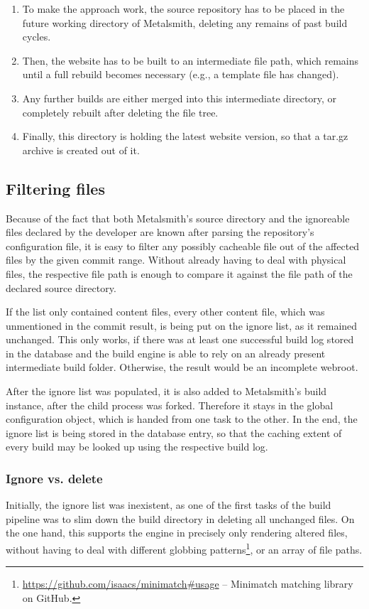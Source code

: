 \begin{enumerate}
  \item To make the approach work, the source repository has to be placed in the future working directory of Metalsmith, deleting any remains of past build cycles.
  \item Then, the website has to be built to an intermediate file path, which remains until a full rebuild becomes necessary (e.g., a template file has changed).
  \item Any further builds are either merged into this intermediate directory, or completely rebuilt after deleting the file tree.
  \item Finally, this directory is holding the latest website version, so that a tar.gz archive is created out of it.
\end{enumerate}

\subsection{Filtering files}
Because of the fact that both Metalsmith's source directory and the ignoreable files declared by the developer are known after parsing the repository's configuration file, it is easy to filter any possibly cacheable file out of the affected files by the given commit range. Without already having to deal with physical files, the respective file path is enough to compare it against the file path of the declared source directory.

If the list only contained content files, every other content file, which was unmentioned in the commit result, is being put on the ignore list, as it remained unchanged. This only works, if there was at least one successful build log stored in the database and the build engine is able to rely on an already present intermediate build folder. Otherwise, the result would be an incomplete webroot.

After the ignore list was populated, it is also added to Metalsmith's build instance, after the child process was forked. Therefore it stays in the global configuration object, which is handed from one task to the other. In the end, the ignore list is being stored in the database entry, so that the caching extent of every build may be looked up using the respective build log.

\subsubsection{Ignore vs. delete}
Initially, the ignore list was inexistent, as one of the first tasks of the build pipeline was to slim down the build directory in deleting all unchanged files. On the one hand, this supports the engine in precisely only rendering altered files, without having to deal with different globbing patterns\footnote{\url{https://github.com/isaacs/minimatch\#usage} -- Minimatch matching library on GitHub.}, or an array of file paths.

